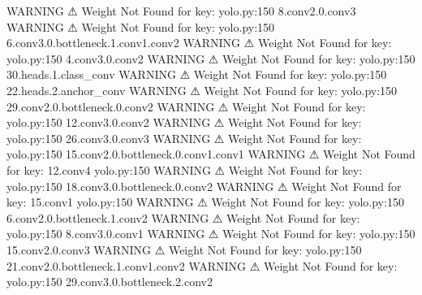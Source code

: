                     WARNING  ⚠ Weight Not Found for key:               yolo.py:150
                             8.conv2.0.conv3                                      
                    WARNING  ⚠ Weight Not Found for key:               yolo.py:150
                             6.conv3.0.bottleneck.1.conv1.conv2                   
                    WARNING  ⚠ Weight Not Found for key:               yolo.py:150
                             4.conv3.0.conv2                                      
                    WARNING  ⚠ Weight Not Found for key:               yolo.py:150
                             30.heads.1.class_conv                                
                    WARNING  ⚠ Weight Not Found for key:               yolo.py:150
                             22.heads.2.anchor_conv                               
                    WARNING  ⚠ Weight Not Found for key:               yolo.py:150
                             29.conv2.0.bottleneck.0.conv2                        
                    WARNING  ⚠ Weight Not Found for key:               yolo.py:150
                             12.conv3.0.conv2                                     
                    WARNING  ⚠ Weight Not Found for key:               yolo.py:150
                             26.conv3.0.conv3                                     
                    WARNING  ⚠ Weight Not Found for key:               yolo.py:150
                             15.conv2.0.bottleneck.0.conv1.conv1                  
                    WARNING  ⚠ Weight Not Found for key: 12.conv4      yolo.py:150
                    WARNING  ⚠ Weight Not Found for key:               yolo.py:150
                             18.conv3.0.bottleneck.0.conv2                        
                    WARNING  ⚠ Weight Not Found for key: 15.conv1      yolo.py:150
                    WARNING  ⚠ Weight Not Found for key:               yolo.py:150
                             6.conv2.0.bottleneck.1.conv2                         
                    WARNING  ⚠ Weight Not Found for key:               yolo.py:150
                             8.conv3.0.conv1                                      
                    WARNING  ⚠ Weight Not Found for key:               yolo.py:150
                             15.conv2.0.conv3                                     
                    WARNING  ⚠ Weight Not Found for key:               yolo.py:150
                             21.conv2.0.bottleneck.1.conv1.conv2                  
                    WARNING  ⚠ Weight Not Found for key:               yolo.py:150
                             29.conv3.0.bottleneck.2.conv2                        
